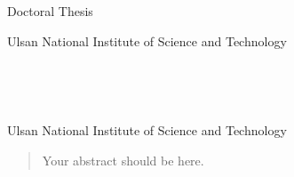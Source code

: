 \documentclass[11pt,a4paper,onecolumn,oneside]{report}
\begin{document}
    \begin{center}
    \LARGE Doctoral Thesis

    \vspace{3cm}
    \huge 

    \vfill

    \LARGE 

    \vspace{2cm}

    \LARGE 

    \vspace{2cm}

    \LARGE Ulsan National Institute of Science and Technology
    \vspace{2cm}

    \LARGE \the\year{}

    \end{center}
    \thispagestyle{empty}
    \clearpage

    \begin{center}
    \hbox{ }

    \hbox{ }

    \huge 

    \vspace{5cm}

    \LARGE 

    \vspace{6cm}

    \LARGE 

    \vspace{2cm}

    \LARGE Ulsan National Institute of Science and Technology

    \end{center}
    \thispagestyle{empty}
    \clearpage





    \begin{abstract}
    Your abstract should be here. \vfill
    \end{abstract}
    \clearpage
\end{document}
